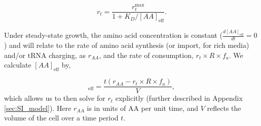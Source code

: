 \begin{equation}
r_t = \frac{r_{t}^{\text{max}}}{1 + K_D/[AA]_{\text{eff}}}.
\label{eq:rt_kd_simple}
\end{equation}

Under steady-state growth, the amino acid concentration is constant
($\frac{d[AA]_\text{eff}}{dt}=0$) and will relate to the rate of amino acid
synthesis (or import, for rich media) and/or tRNA charging, as $r_{AA}$, and the
rate of consumption, $r_t\times R \times f_a$. We calculate
$[AA]_\text{eff}$ by,

\begin{equation}
   [AA]_\text{eff} = \frac{t(r_{AA} - r_t \times R \times f_a)}{V},
   \label{eq:aa_final}
\end{equation}
which allows us to then solve for $r_t$ explicitly (further described in Appendix \ref{sec:SI_model}). Here $r_{AA}$ is in units of AA per unit time, and $V$ reflects the volume of the cell over a time period $t$.

